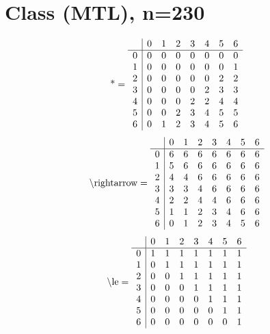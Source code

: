 \documentclass[11pt]{article}
\begin{document}
\section{Class (MTL), n=230}
\[\text{*} = 
\begin{array}{r | r r r r r r r}
 & 0 & 1 & 2 & 3 & 4 & 5 & 6 \\ \hline
0 & 0 & 0 & 0 & 0 & 0 & 0 & 0 \\
1 & 0 & 0 & 0 & 0 & 0 & 0 & 1 \\
2 & 0 & 0 & 0 & 0 & 0 & 2 & 2 \\
3 & 0 & 0 & 0 & 0 & 2 & 3 & 3 \\
4 & 0 & 0 & 0 & 2 & 2 & 4 & 4 \\
5 & 0 & 0 & 2 & 3 & 4 & 5 & 5 \\
6 & 0 & 1 & 2 & 3 & 4 & 5 & 6 \\
\end{array}
\]
\[\text{\textbackslash rightarrow} = 
\begin{array}{r | r r r r r r r}
 & 0 & 1 & 2 & 3 & 4 & 5 & 6 \\ \hline
0 & 6 & 6 & 6 & 6 & 6 & 6 & 6 \\
1 & 5 & 6 & 6 & 6 & 6 & 6 & 6 \\
2 & 4 & 4 & 6 & 6 & 6 & 6 & 6 \\
3 & 3 & 3 & 4 & 6 & 6 & 6 & 6 \\
4 & 2 & 2 & 4 & 4 & 6 & 6 & 6 \\
5 & 1 & 1 & 2 & 3 & 4 & 6 & 6 \\
6 & 0 & 1 & 2 & 3 & 4 & 5 & 6 \\
\end{array}
\]
\[\text{\textbackslash le} = 
\begin{array}{r | r r r r r r r}
 & 0 & 1 & 2 & 3 & 4 & 5 & 6 \\ \hline
0 & 1 & 1 & 1 & 1 & 1 & 1 & 1 \\
1 & 0 & 1 & 1 & 1 & 1 & 1 & 1 \\
2 & 0 & 0 & 1 & 1 & 1 & 1 & 1 \\
3 & 0 & 0 & 0 & 1 & 1 & 1 & 1 \\
4 & 0 & 0 & 0 & 0 & 1 & 1 & 1 \\
5 & 0 & 0 & 0 & 0 & 0 & 1 & 1 \\
6 & 0 & 0 & 0 & 0 & 0 & 0 & 1 \\
\end{array}
\]
\end{document}
